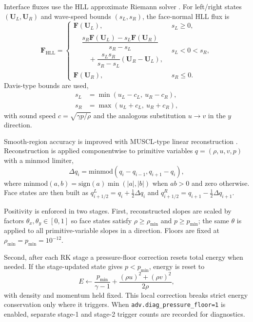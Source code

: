 \documentclass[final,3p,times,twocolumn]{elsarticle}
\begin{document}
Interface fluxes use the HLL approximate Riemann solver \cite{hll1983,toro2009}. For left/right states $(\mathbf{U}_L,\mathbf{U}_R)$ and wave-speed bounds $(s_L,s_R)$, the face-normal HLL flux is
\begin{equation}
\mathbf{F}_{\mathrm{HLL}}=
\begin{cases}
\mathbf{F}(\mathbf{U}_L), & s_L\ge 0,\\
\begin{aligned}
&\dfrac{s_R\mathbf{F}(\mathbf{U}_L)-s_L\mathbf{F}(\mathbf{U}_R)}{s_R-s_L}\\
&\quad+\dfrac{s_Ls_R}{s_R-s_L}\left(\mathbf{U}_R-\mathbf{U}_L\right),
\end{aligned}
& s_L<0<s_R,\\
\mathbf{F}(\mathbf{U}_R), & s_R\le 0.
\end{cases}
\end{equation}
Davis-type bounds are used,
\begin{equation}
\begin{aligned}
s_L&=\min(u_L-c_L,\ u_R-c_R),\\
s_R&=\max(u_L+c_L,\ u_R+c_R),
\end{aligned}
\end{equation}
with sound speed $c=\sqrt{\gamma p/\rho}$ and the analogous substitution $u\to v$ in the $y$ direction.

Smooth-region accuracy is improved with MUSCL-type linear reconstruction \cite{vanleer1979}. Reconstruction is applied componentwise to primitive variables $q=(\rho,u,v,p)$ with a minmod limiter,
\begin{equation}
\Delta q_i=\mathrm{minmod}(q_i-q_{i-1},q_{i+1}-q_i),
\end{equation}
where $\mathrm{minmod}(a,b)=\mathrm{sign}(a)\min(|a|,|b|)$ when $ab>0$ and zero otherwise. Face states are then built as $q_{i+1/2}^L=q_i+\tfrac{1}{2}\Delta q_i$ and $q_{i+1/2}^R=q_{i+1}-\tfrac{1}{2}\Delta q_{i+1}$.

Positivity is enforced in two stages. First, reconstructed slopes are scaled by factors $\theta_x,\theta_y\in[0,1]$ so face states satisfy $\rho\ge \rho_{\min}$ and $p\ge p_{\min}$; the same $\theta$ is applied to all primitive-variable slopes in a direction. Floors are fixed at $\rho_{\min}=p_{\min}=10^{-12}$.

Second, after each RK stage a pressure-floor correction resets total energy when needed. If the stage-updated state gives $p<p_{\min}$, energy is reset to
\begin{equation}
E \leftarrow \frac{p_{\min}}{\gamma-1}
+\frac{(\rho u)^2+(\rho v)^2}{2\rho},
\end{equation}
with density and momentum held fixed. This local correction breaks strict energy conservation only where it triggers. When \texttt{adv.diag\_pressure\_floor=1} is enabled, separate stage-1 and stage-2 trigger counts are recorded for diagnostics.
\end{document}
